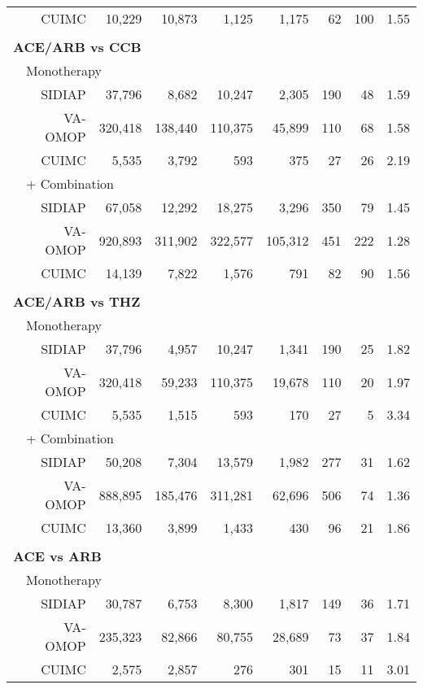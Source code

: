 \documentclass[11pt,]{article}
\begin{document}
\begin{longtable}{p{-2em}p{-2em}rrrrrrrr}
   &  & CUIMC & 10,229 & 10,873 & 1,125 & 1,175 & 62 & 100 & 1.55 \\ 
   \rowcolor{white} \\ \multicolumn{9}{l}{\textbf{ACE/ARB vs CCB}} \\ & \multicolumn{9}{l}{Monotherapy}  \\ &  & SIDIAP & 37,796 & 8,682 & 10,247 & 2,305 & 190 & 48 & 1.59 \\ 
   &  & VA-OMOP & 320,418 & 138,440 & 110,375 & 45,899 & 110 & 68 & 1.58 \\ 
   &  & CUIMC & 5,535 & 3,792 & 593 & 375 & 27 & 26 & 2.19 \\ 
                           & \multicolumn{8}{l}{+ Combination} \\ &  & SIDIAP & 67,058 & 12,292 & 18,275 & 3,296 & 350 & 79 & 1.45 \\ 
   &  & VA-OMOP & 920,893 & 311,902 & 322,577 & 105,312 & 451 & 222 & 1.28 \\ 
   &  & CUIMC & 14,139 & 7,822 & 1,576 & 791 & 82 & 90 & 1.56 \\ 
   \rowcolor{white} \\ \multicolumn{9}{l}{\textbf{ACE/ARB vs THZ}} \\ & \multicolumn{9}{l}{Monotherapy}  \\ &  & SIDIAP & 37,796 & 4,957 & 10,247 & 1,341 & 190 & 25 & 1.82 \\ 
   &  & VA-OMOP & 320,418 & 59,233 & 110,375 & 19,678 & 110 & 20 & 1.97 \\ 
   &  & CUIMC & 5,535 & 1,515 & 593 & 170 & 27 & 5 & 3.34 \\ 
                           & \multicolumn{8}{l}{+ Combination} \\ &  & SIDIAP & 50,208 & 7,304 & 13,579 & 1,982 & 277 & 31 & 1.62 \\ 
   &  & VA-OMOP & 888,895 & 185,476 & 311,281 & 62,696 & 506 & 74 & 1.36 \\ 
   &  & CUIMC & 13,360 & 3,899 & 1,433 & 430 & 96 & 21 & 1.86 \\ 
   \rowcolor{white} \\ \multicolumn{9}{l}{\textbf{ACE vs ARB}} \\ & \multicolumn{9}{l}{Monotherapy}  \\ &  & SIDIAP & 30,787 & 6,753 & 8,300 & 1,817 & 149 & 36 & 1.71 \\ 
   &  & VA-OMOP & 235,323 & 82,866 & 80,755 & 28,689 & 73 & 37 & 1.84 \\ 
   &  & CUIMC & 2,575 & 2,857 & 276 & 301 & 15 & 11 & 3.01 \\ 

\end{longtable}
\end{document}
